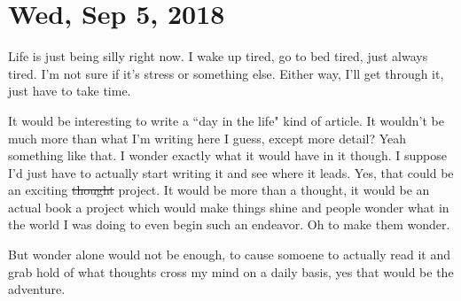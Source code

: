 \section{Wed, Sep 5, 2018}

Life is just being silly right now. I wake up tired, go to bed tired, just always
tired. I'm not sure if it's stress or something else. Either way, I'll get through
it, just have to take time.

It would be interesting to write a ``day in the life" kind of article. It wouldn't be
much more than what I'm writing here I guess, except more detail? Yeah something like
that. I wonder exactly what it would have in it though. I suppose I'd just have to
actually start writing it and see where it leads. Yes, that could be an exciting
\st{thought} project. It would be more than a thought, it would be an actual book a
project which would make things shine and people wonder what in the world I was doing
to even begin such an endeavor. Oh to make them wonder.

But wonder alone would not be enough, to cause somoene to actually read it and grab
hold of what thoughts cross my  mind on a daily basis, yes that would be the
adventure.
